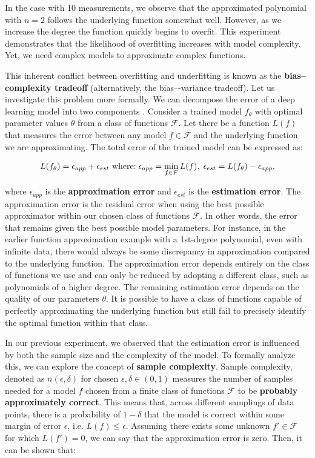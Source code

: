 In the case with 10 measurements, we observe that the approximated polynomial with $n = 2$ follows the underlying function somewhat well. However, as we increase the degree the function quickly begins to overfit. This experiment demonstrates that the likelihood of overfitting increases with model complexity. Yet, we need complex models to approximate complex functions.

This inherent conflict between overfitting and underfitting is known as the \textbf{bias--complexity tradeoff} (alternatively, the bias–-variance tradeoff). Let us investigate this problem more formally. We can decompose the error of a deep learning model into two components \cite{shalev-shwartzUnderstandingMachineLearning2014}. Consider a trained model $f_\theta$ with optimal parameter values $\theta$ from a class of functions $\mathcal{F}$. Let there be a function $L(f)$ that measures the error between any model $f \in \mathcal{F}$ and the underlying function we are approximating. The total error of the trained model can be expressed as:

\begin{equation}
	L(f_\theta) = \epsilon_{app} + \epsilon_{est}
	\text{ where:\;}  \epsilon_{app} = \min_{f \in F}L(f),\;
	\epsilon_{est} = L(f_\theta) - \epsilon_{app},
\end{equation}

where $\epsilon_{app}$ is the \textbf{approximation error} and $\epsilon_{est}$ is the \textbf{estimation error}. The approximation error is the residual error when using the best possible approximator within our chosen class of functions $\mathcal{F}$. In other words, the error that remains given the best possible model parameters. For instance, in the earlier function approximation example with a 1st-degree polynomial, even with infinite data, there would always be some discrepancy in approximation compared to the underlying function. The approximation error depends entirely on the class of functions we use and can only be reduced by adopting a different class, such as polynomials of a higher degree. The remaining estimation error depends on the quality of our parameters $\theta$. It is possible to have a class of functions capable of perfectly approximating the underlying function but still fail to precisely identify the optimal function within that class.

In our previous experiment, we observed that the estimation error is influenced by both the sample size and the complexity of the model. To formally analyze this, we can explore the concept of \textbf{sample complexity}. Sample complexity, denoted as $n(\epsilon, \delta)$ for chosen $\epsilon, \delta \in (0, 1)$ measures the number of samples needed for a model $f$ chosen from a finite class of functions $\mathcal{F}$ to be \textbf{probably approximately correct}. This means that, across different samplings of data points, there is a probability of $1 - \delta$ that the model is correct within some margin of error $\epsilon$, i.e. $L(f) \leq \epsilon$. Assuming there exists some unknown $f' \in \mathcal{F}$ for which $L(f') = 0$, we can say that the approximation error is zero. Then, it can be shown \cite{shalev-shwartzUnderstandingMachineLearning2014} that:

